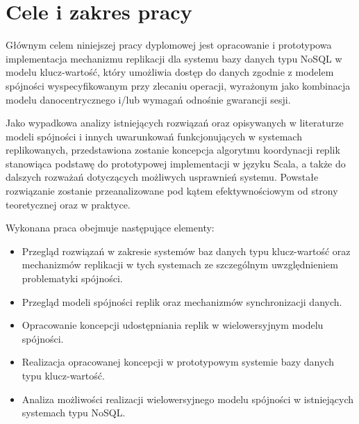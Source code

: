 
\section{Cele i zakres pracy}

Głównym celem niniejszej pracy dyplomowej jest opracowanie i prototypowa implementacja mechanizmu replikacji dla systemu bazy danych typu NoSQL w modelu klucz-wartość, który umożliwia dostęp do danych zgodnie z modelem spójności wyspecyfikowanym przy zlecaniu operacji, wyrażonym jako kombinacja modelu danocentrycznego i/lub wymagań odnośnie gwarancji sesji.

Jako wypadkowa analizy istniejących rozwiązań oraz opisywanych w literaturze modeli spójności i innych uwarunkowań funkcjonujących w systemach replikowanych, przedstawiona zostanie koncepcja algorytmu koordynacji replik stanowiąca podstawę do prototypowej implementacji w języku Scala, a także do dalszych rozważań dotyczących możliwych usprawnień systemu. Powstałe rozwiązanie zostanie przeanalizowane pod kątem efektywnościowym od strony teoretycznej oraz w praktyce.

Wykonana praca obejmuje następujące elementy:

\begin{itemize}
    \item Przegląd rozwiązań w zakresie systemów baz danych typu klucz-wartość oraz mechanizmów replikacji w tych systemach ze szczególnym uwzględnieniem problematyki spójności.
    \item Przegląd modeli spójności replik oraz mechanizmów synchronizacji danych.
    \item Opracowanie koncepcji udostępniania replik w wielowersyjnym modelu spójności.
    \item Realizacja opracowanej koncepcji w prototypowym systemie bazy danych typu klucz-wartość.
    \item Analiza możliwości realizacji wielowersyjnego modelu spójności w istniejących systemach typu NoSQL.

\end{itemize}

